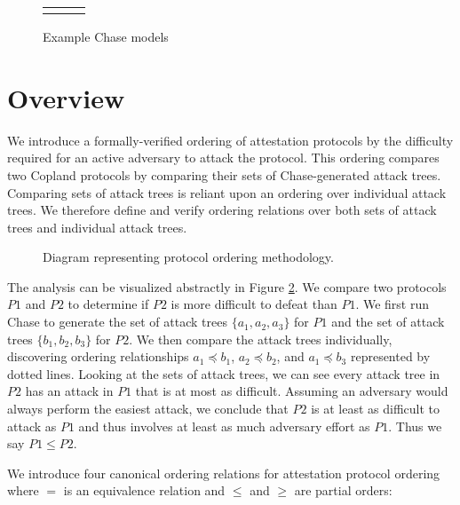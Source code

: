 \documentclass[runningheads]{llncs}
\theoremstyle{definition}
\begin{document}
\begin{figure}[hbtp]
    \centering 
    \begin{tabular}{m{3cm} m{3cm} m{3cm}}
         &  &  
    \end{tabular}
    \caption[Example Chase Models]{Example Chase models}
    \label{fig:chase-ex}
\end{figure}




\section{Overview}
We introduce a formally-verified ordering of attestation protocols by
the difficulty required for an active adversary to attack the
protocol. This ordering compares two Copland protocols by comparing
their sets of Chase-generated attack trees. Comparing sets of attack trees is reliant upon an ordering over individual attack trees.
We therefore define and verify ordering relations over both sets of attack trees and individual attack trees.

\begin{figure}[hbtp]
    \centering
    \captionsetup{justification=centering,margin=1cm}
    
    \caption[Protocol ordering abstraction]{Diagram representing protocol ordering methodology. }
    \label{fig:protocol-org-fig}
\end{figure}

The analysis can be visualized abstractly in Figure
\ref{fig:protocol-org-fig}.  We compare two protocols $P1$ and $P2$ to
determine if $P2$ is more difficult to defeat than $P1$. We first run
Chase to generate the set of attack trees $\{ a_1, a_2, a_3\}$ for
$P1$ and the set of attack trees $\{b_1, b_2, b_3\}$ for $P2$. We then
compare the attack trees individually, discovering ordering
relationships $a_1 \preceq b_1$, $a_2 \preceq b_2$, and
$a_1 \preceq b_3$ represented by dotted lines. Looking at the sets of
attack trees, we can see every attack tree in $P2$ has an attack in
$P1$ that is at most as difficult. Assuming an adversary would always
perform the easiest attack, we conclude that $P2$ is at least as
difficult to attack as $P1$ and thus involves at least as much
adversary effort as $P1$. Thus we say $P1 \leq P2$.

We introduce four canonical ordering relations for attestation
protocol ordering where $=$ is an equivalence relation and $\le$ and
$\ge$ are partial orders:
\end{document}
